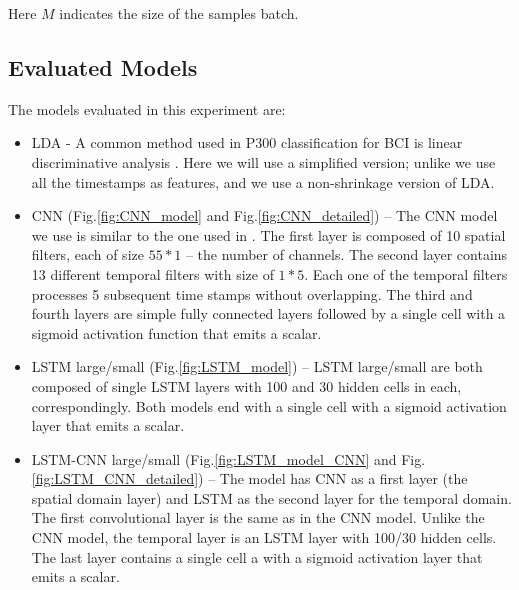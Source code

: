 \documentclass[
12pt, %
english, %
doublespacing, %
headsepline, %
]{MastersDoctoralThesis} %
\begin{document}
Here $M$ indicates the size of the samples batch.


\subsection{Evaluated Models}
The models evaluated in this experiment are:
\begin{itemize}
	\item LDA - A common method used in P300 classification for BCI is linear discriminative analysis \cite{BlaknertzExperiment,P300_Tutorial}. Here we will use a simplified version; unlike \cite{BlaknertzExperiment} we use all the timestamps as features, and we use a non-shrinkage version of LDA.
	
	\item CNN (Fig.\ref{fig:CNN_model} and Fig.\ref{fig:CNN_detailed}) -- The CNN model we use is similar to the one used in \cite{P300_CNN}. The first layer is composed of 10  spatial filters, each of size $55*1$ -- the number of channels. The second layer contains 13 different temporal filters with size of $1*5$. Each one of the temporal filters processes 5 subsequent time stamps without overlapping. The third and fourth layers are simple fully connected layers followed by a single cell with a sigmoid activation function that emits a scalar.
	
	\item LSTM large/small (Fig.\ref{fig:LSTM_model}) -- LSTM large/small are both composed of single LSTM layers with 100 and 30 hidden cells in each, correspondingly. Both models end with a single cell with a sigmoid activation layer that emits a scalar.
	
	\item LSTM-CNN large/small (Fig.\ref{fig:LSTM_model_CNN} and Fig.\ref{fig:LSTM_CNN_detailed}) -- The model has CNN as a first layer (the spatial domain layer) and LSTM as the second layer for the temporal domain. The first convolutional layer is the same as in the CNN model. Unlike the CNN model, the temporal layer is an LSTM layer with 100/30 hidden cells. The last layer contains a single cell a with a sigmoid activation layer that emits a scalar.

\end{itemize}
\end{document}
